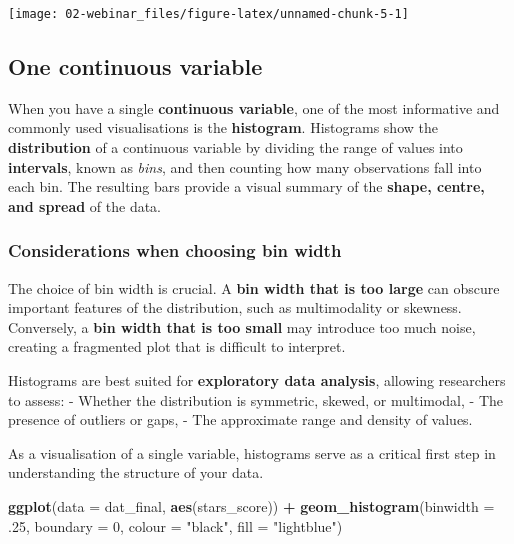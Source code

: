 \documentclass[
  oneside]{book}
\newenvironment{Shaded}{\begin{snugshade}}{\end{snugshade}}
\newcommand{\AttributeTok}[1]{\textcolor[rgb]{0.13,0.29,0.53}{#1}}
\newcommand{\DecValTok}[1]{\textcolor[rgb]{0.00,0.00,0.81}{#1}}
\newcommand{\FunctionTok}[1]{\textcolor[rgb]{0.13,0.29,0.53}{\textbf{#1}}}
\newcommand{\NormalTok}[1]{#1}
\newcommand{\SpecialCharTok}[1]{\textcolor[rgb]{0.81,0.36,0.00}{\textbf{#1}}}
\newcommand{\StringTok}[1]{\textcolor[rgb]{0.31,0.60,0.02}{#1}}
\begin{document}
\begin{center}\texttt{[image: 02-webinar\_files/figure-latex/unnamed-chunk-5-1]} \end{center}

\subsection{One continuous variable}\label{one-continuous-variable}

When you have a single \textbf{continuous variable}, one of the most informative and commonly used visualisations is the \textbf{histogram}. Histograms show the \textbf{distribution} of a continuous variable by dividing the range of values into \textbf{intervals}, known as \emph{bins}, and then counting how many observations fall into each bin. The resulting bars provide a visual summary of the \textbf{shape, centre, and spread} of the data.

\subsubsection{Considerations when choosing bin width}\label{considerations-when-choosing-bin-width}

The choice of bin width is crucial. A \textbf{bin width that is too large} can obscure important features of the distribution, such as multimodality or skewness. Conversely, a \textbf{bin width that is too small} may introduce too much noise, creating a fragmented plot that is difficult to interpret.

Histograms are best suited for \textbf{exploratory data analysis}, allowing researchers to assess:
- Whether the distribution is symmetric, skewed, or multimodal,
- The presence of outliers or gaps,
- The approximate range and density of values.

As a visualisation of a single variable, histograms serve as a critical first step in understanding the structure of your data.

\begin{Shaded}
\begin{Highlighting}[]
\FunctionTok{ggplot}\NormalTok{(}\AttributeTok{data =}\NormalTok{ dat\_final, }\FunctionTok{aes}\NormalTok{(stars\_score)) }\SpecialCharTok{+}
  \FunctionTok{geom\_histogram}\NormalTok{(}\AttributeTok{binwidth =}\NormalTok{ .}\DecValTok{25}\NormalTok{, }
                 \AttributeTok{boundary =} \DecValTok{0}\NormalTok{, }
                 \AttributeTok{colour =} \StringTok{"black"}\NormalTok{,}
                 \AttributeTok{fill =} \StringTok{"lightblue"}\NormalTok{) }
\end{Highlighting}
\end{Shaded}
\end{document}
